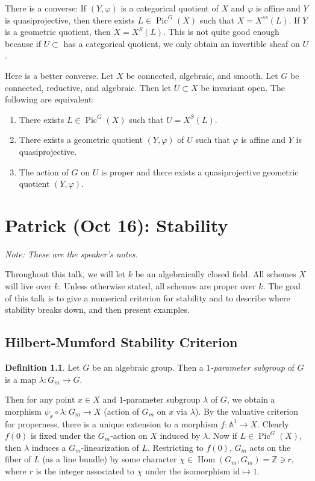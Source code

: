 \documentclass[leqno, openany]{memoir}
\theoremstyle{definition}
\newtheorem{defn}[thm]{Definition}
\theoremstyle{remark}
\theoremstyle{plain}
\theoremstyle{definition}
\theoremstyle{remark}
\newcommand{\A}{\mathbb{A}}
\newcommand{\Z}{\mathbb{Z}}
\newcommand{\mr}[1]{\mathrm{#1}}
\DeclareMathOperator{\Hom}{Hom}
\DeclareMathOperator{\Pic}{Pic}
\begin{document}
There is a converse: If $(Y, \varphi)$ is a categorical quotient of $X$ and $\varphi$ is affine and $Y$ is quasiprojective, then there exists $L \in \Pic^G(X)$ such that $X = X^{ss}(L)$. If $Y$ is a geometric quotient, then $X = X^S(L)$. This is not quite good enough because if $U \subset $ has a categorical quotient, we only obtain an invertible sheaf on $U$.

Here is a better converse. Let $X$ be connected, algebraic, and smooth. Let $G$ be connected, reductive, and algebraic. Then let $U \subset X$ be invariant open. The following are equivalent:
\begin{enumerate}
    \item There exists $L \in \Pic^G(X)$ such that $U = X^S(L)$.
    \item There exists a geometric quotient $(Y, \varphi)$ of $U$ such that $\varphi$ is affine and $Y$ is quasiprojective.
    \item The action of $G$ on $U$ is proper and there exists a quasiprojective geometric quotient $(Y, \varphi)$.
\end{enumerate}

\chapter{Patrick (Oct 16): Stability}%
\label{cha:patrick_oct_16_stability}

\textit{Note: These are the speaker's notes.} 

Throughout this talk, we will let $k$ be an algebraically closed field. All schemes $X$ will live over $k$. Unless otherwise stated, all schemes are proper over $k$. The goal of this talk is to give a numerical criterion for stability and to describe where stability breaks down, and then present examples.

\section{Hilbert-Mumford Stability Criterion}%
\label{sec:hilbert_mumford_stability_criterion}

\begin{defn}
    Let $G$ be an algebraic group. Then a \textit{$1$-parameter subgroup} of $G$ is a map $\lambda \colon G_m \to G$.  
\end{defn}

Then for any point $x \in X$ and $1$-parameter subgroup $\lambda$ of $G$, we obtain a morphism $\psi_x \circ \lambda \colon G_m \to X$ (action of $G_m$ on $x$ via $\lambda$). By the valuative criterion for properness, there is a unique extension to a morphism $f \colon \A^1 \to X$. Clearly $f(0)$ is fixed under the $G_m$-action on $X$ induced by $\lambda$. Now if $L \in \Pic^G(X)$, then $\lambda$ induces a $G_m$-linearization of $L$. Restricting to $f(0)$, $G_m$ acts on the fiber of $L$ (as a line bundle) by some character $\chi \in \Hom(G_m, G_m) = \Z \ni r$, where $r$ is the integer associated to $\chi$ under the isomorphism $\mr{id} \mapsto 1$.
\end{document}
